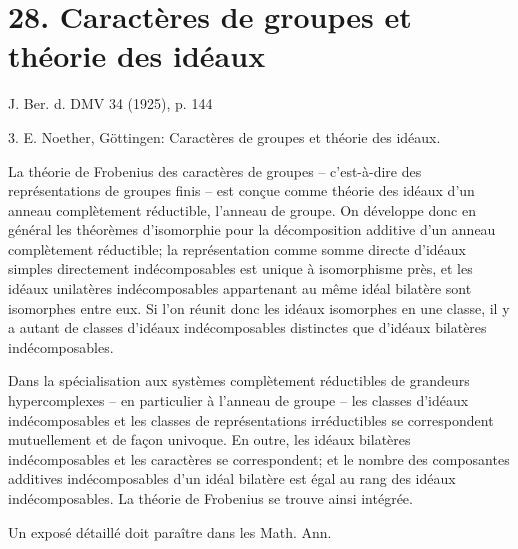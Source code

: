 
\section*{28. Caractères de groupes et théorie des idéaux}

\begin{center}
J. Ber. d. DMV 34 (1925), p. 144
\end{center}

3. E. Noether, Göttingen: Caractères de groupes et théorie des idéaux.

La théorie de Frobenius des caractères de groupes -- c'est-à-dire des représentations de groupes finis -- est conçue comme théorie des idéaux d'un anneau complètement réductible, l'anneau de groupe. On développe donc en général les théorèmes d'isomorphie pour la décomposition additive d'un anneau complètement réductible; la représentation comme somme directe d'idéaux simples directement indécomposables est unique à isomorphisme près, et les idéaux unilatères indécomposables appartenant au même idéal bilatère sont isomorphes entre eux. Si l'on réunit donc les idéaux isomorphes en une classe, il y a autant de classes d'idéaux indécomposables distinctes que d'idéaux bilatères indécomposables.

Dans la spécialisation aux systèmes complètement réductibles de grandeurs hypercomplexes -- en particulier à l'anneau de groupe -- les classes d'idéaux indécomposables et les classes de représentations irréductibles se correspondent mutuellement et de façon univoque. En outre, les idéaux bilatères indécomposables et les caractères se correspondent; et le nombre des composantes additives indécomposables d'un idéal bilatère est égal au rang des idéaux indécomposables. La théorie de Frobenius se trouve ainsi intégrée.

Un exposé détaillé doit paraître dans les Math. Ann.

